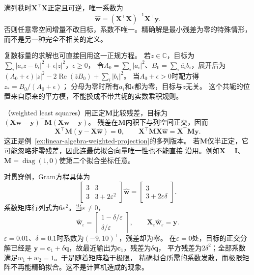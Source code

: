满列秩时$\bm X^\top\bm X$正定且可逆，唯一系数为
\begin{equation}
 \widehat{\bm w}=(\bm X^\top\bm X)^{-1}\bm X^\top\bm y.
 \label{eq:linear-algebra-full-rank-least-squares}
\end{equation}
否则任意零空间增量不改目标，系数不唯一。精确解是最小残差为零的特殊情形，
而不是另一种完全不相关的定义。

复数标量的求解也可直接回用这一正规方程。
若$z\in\mathbb C$，目标为$\sum_i|a_i z-b_i|^2+\epsilon|z|^2$，$\epsilon\geq0$，
令$A_0=\sum_i|a_i|^2$、$B_0=\sum_i\overline{a_i}b_i$，展开后为
$(A_0+\epsilon)|z|^2-2\operatorname{Re}(\overline z B_0)+\sum_i|b_i|^2$。
当$A_0+\epsilon>0$时配方得$z_*=B_0/(A_0+\epsilon)$；
分母为零时所有$a_i$和$\epsilon$都为零，目标与$z$无关。
这个共轭的位置来自原来的平方模，不能换成不带共轭的实数乘积规则。

（weighted least squares）用正定$\bm M$比较残差，目标为
$(\bm X\bm w-\bm y)^\top\bm M(\bm X\bm w-\bm y)$。
残差在$\bm M$内积下与列空间正交，因而
\begin{equation}
 \bm X^\top\bm M(\bm y-\bm X\widehat{\bm w})=\bm0,\qquad
 \bm X^\top\bm M\bm X\widehat{\bm w}=\bm X^\top\bm M\bm y.
 \label{eq:linear-algebra-weighted-normal-equations}
\end{equation}
这正是例~\ref{ex:linear-algebra-weighted-projection}的多列版本。
若$\bm M$仅半正定，它可能忽略非零残差，因此连最优拟合向量唯一性也不能直接
沿用。例如$\bm X=\bm I$、$\bm M=\operatorname{diag}(1,0)$使第二个拟合坐标任意。

对贯穿例，Gram方程具体为
\[
 \begin{bmatrix}3&3\\3&3+2\varepsilon^2\end{bmatrix}\widehat{\bm w}
 =\begin{bmatrix}3\\3+2\varepsilon\delta\end{bmatrix}.
\]
系数矩阵行列式为$6\varepsilon^2$。当$\varepsilon\neq0$，
\begin{equation}
 \widehat{\bm w}_\varepsilon
 =\begin{bmatrix}1-\delta/\varepsilon\\\delta/\varepsilon\end{bmatrix},
 \qquad\bm X_\varepsilon\widehat{\bm w}_\varepsilon=\bm y.
 \label{eq:linear-algebra-nearly-collinear-least-squares}
\end{equation}
$\varepsilon=0.01$、$\delta=0.1$时系数为$(-9,10)^\top$，残差却为零。
在$\varepsilon=0$处，目标的正交分解已经是
$\bm y=\bm c_1+\delta\bm q$，故最近输出为$\bm c_1$，残差为$\delta\bm q$，
平方残差为$2\delta^2$；全部系数满足$w_1+w_2=1$。于是随着矩阵趋于极限，
精确拟合所需的系数发散，而极限矩阵不再能精确拟合。这不是计算机造成的现象。


